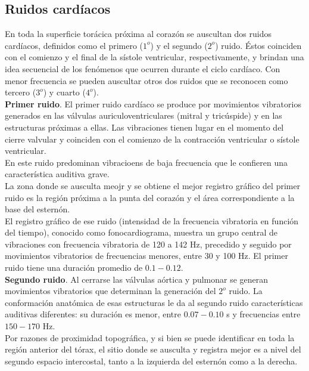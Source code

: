 \subsection{Ruidos cardíacos} \label{subsection:cardiac-sounds}

    En toda la superficie torácica próxima al corazón se auscultan dos ruidos cardíacos, definidos como el primero
($1^o$) y el segundo ($2^o$) ruido. Éstos coinciden con el comienzo y el final de la sístole ventricular,
respectivamente, y brindan una idea secuencial de los fenómenos que ocurren durante el ciclo cardíaco. Con menor
frecuencia se pueden auscultar otros dos ruidos que se reconocen como tercero ($3^o$) y cuarto ($4^o$). \\
    \indent \textbf{Primer ruido}. El primer ruido cardíaco se produce por movimientos vibratorios generados en las
válvulas auriculoventriculares (mitral y tricúspide) y en las estructuras próximas a ellas. Las vibraciones tienen
lugar en el momento del cierre valvular y coinciden con el comienzo de la contracción ventricular o sístole
ventricular. \\
    \indent En este ruido predominan vibracioens de baja frecuencia que le confieren una característica auditiva
grave. \\
    \indent La zona donde se ausculta meojr y se obtiene el mejor registro gráfico del primer ruido es la región
próxima a la punta del corazón y el área correspondiente a la base del esternón. \\
    \indent El registro gráfico de ese ruido (intensidad de la frecuencia vibratoria en función del tiempo),
conocido como fonocardiograma, muestra un grupo central de vibraciones con frecuencia vibratoria de 120 a 142 Hz,
precedido y seguido por movimientos vibratorios de frecuencias menores, entre 30 y 100 Hz. El primer ruido tiene una
duración promedio de $0.1-0.12$. \\
    \indent \textbf{Segundo ruido}. Al cerrarse las válvulas aórtica y pulmonar se generan movimientos vibratorios
que determinan la generación del $2^o$ ruido. La conformación anatómica de esas estructuras le da al segundo ruido
características auditivas diferentes: su duración es menor, entre $0.07-0.10$ s y frecuencias entre $150-170$ Hz. \\
    \indent Por razones de proximidad topográfica, y si bien se puede identificar en toda la región anterior del
tórax, el sitio donde se ausculta y registra mejor es a nivel del segundo espacio intercostal, tanto a la izquierda
del esternón como a la derecha.
